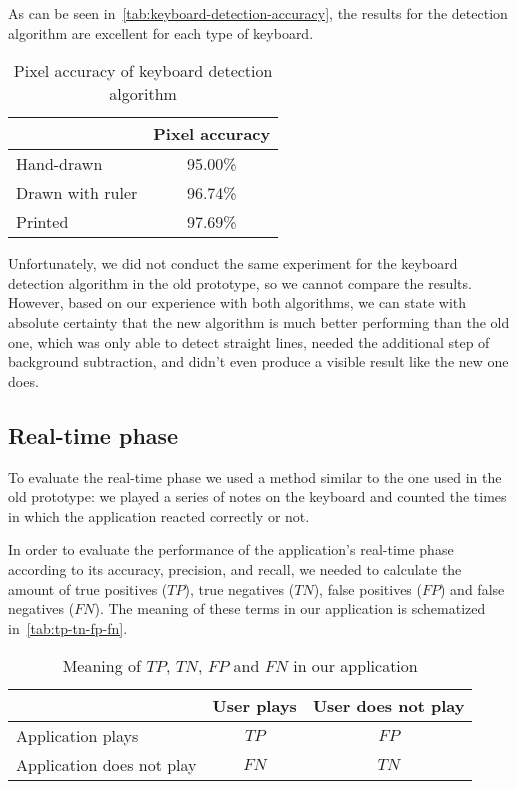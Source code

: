As can be seen in~\autoref{tab:keyboard-detection-accuracy},
the results for the detection algorithm are excellent for each type of keyboard.

\begin{table}[ht]
	\centering
	\begin{tabular}{l|l|}
		\cline{2-2}
		& Pixel accuracy               \\ \hline
		\multicolumn{1}{|l|}{Hand-drawn}       & \multicolumn{1}{c|}{95.00\%} \\ \hline
		\multicolumn{1}{|l|}{Drawn with ruler} & \multicolumn{1}{c|}{96.74\%} \\ \hline
		\multicolumn{1}{|l|}{Printed}          & \multicolumn{1}{c|}{97.69\%} \\ \hline
	\end{tabular}
	\caption{Pixel accuracy of keyboard detection algorithm}
	\label{tab:keyboard-detection-accuracy}
\end{table}

Unfortunately, we did not conduct the same experiment for the keyboard detection algorithm in the old prototype,
so we cannot compare the results.
However, based on our experience with both algorithms,
we can state with absolute certainty that the new algorithm is much better performing than the old one,
which was only able to detect straight lines, needed the additional step of background subtraction,
and didn't even produce a visible result like the new one does.

\subsection{Real-time phase}\label{subsec:real-time-phase-results}
To evaluate the real-time phase we used a method similar to the one used in the old prototype:
we played a series of notes on the keyboard and counted the times in which the application reacted correctly or not.

In order to evaluate the performance of the application's real-time phase according to its accuracy,
precision, and recall, we needed to calculate the amount of true positives ($TP$), true negatives ($TN$),
false positives ($FP$) and false negatives ($FN$).
The meaning of these terms in our application is schematized in~\autoref{tab:tp-tn-fp-fn}.

\begin{table}[ht]
	\centering
	\begin{tabular}{l|l|l|}
		\cline{2-3}
		& User plays                & User does not play        \\ \hline
		\multicolumn{1}{|l|}{Application plays}         & \multicolumn{1}{c|}{$TP$} & \multicolumn{1}{c|}{$FP$} \\ \hline
		\multicolumn{1}{|l|}{Application does not play} & \multicolumn{1}{c|}{$FN$} & \multicolumn{1}{c|}{$TN$} \\ \hline
	\end{tabular}
	\caption{Meaning of $TP$, $TN$, $FP$ and $FN$ in our application}
	\label{tab:tp-tn-fp-fn}
\end{table}


